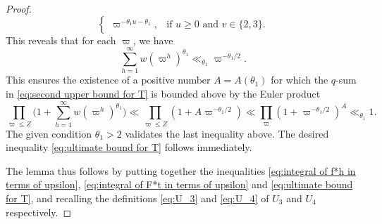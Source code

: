 \documentclass[12pt,english,reqno]{amsart}
\theoremstyle{definition}
\theoremstyle{remark}
\numberwithin{equation}{section}
\numberwithin{equation}{section}
\numberwithin{figure}{section}
\theoremstyle{plain}
\theoremstyle{plain}
\theoremstyle{plain}
\theoremstyle{plain}
\numberwithin{equation}{section}
\numberwithin{thm}{section}
\begin{document}
\begin{proof}
\[\begin{cases}
\varpi^{-\theta_1u-\theta_1}, & \text{if }u\geq0\text{ and }v\in\{2,3\}.\end{cases}\]
This reveals that for each $\varpi$, we have
\[
\sum_{h=1}^{\infty}w(\varpi^{h})^{\theta_1}\ll_{\theta_1}\varpi^{-\theta_1/2}.\]
This ensures the existence of a positive number $A=A(\theta_1)$ for which 
the $q$-sum in \eqref{eq:second upper bound for T} is bounded above by the
Euler product
\[
\prod_{\varpi\leq Z}\Big(1+\sum_{h=1}^{\infty}w(\varpi^{h})^{\theta_1}\Big)\ll\prod_{\varpi\leq Z}(1+A\varpi^{-\theta_1/2})\ll\prod_{\varpi}(1+\varpi^{-\theta_1/2})^A\ll_{\theta_1}1.\]
The given condition $\theta_1>2$ validates the last inequality above. The desired inequality \eqref{eq:ultimate bound for T} follows immediately.
\par The lemma thus follows by putting together the inequalities \eqref{eq:integral of f*h in terms of upsilon}, \eqref{eq:integral of F*t in terms of upsilon} and \eqref{eq:ultimate bound for T}, and recalling the definitions \eqref{eq:U_3} and \eqref{eq:U_4} of $U_3$ and $U_4$ respectively.
\end{proof}
\end{document}
